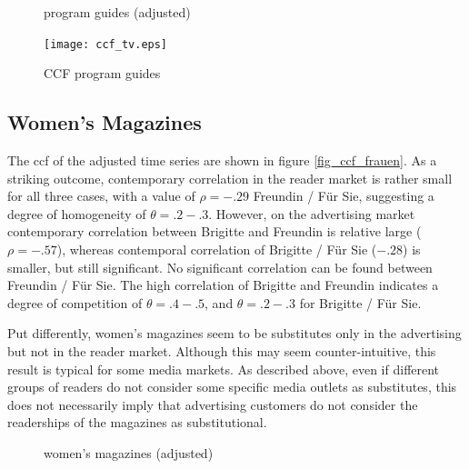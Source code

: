 \documentclass[12pt,a4paper,notitlepage]{article}
\begin{document}
\begin{figure}[H]
\caption{program guides (adjusted)}
\label{fig_arima_circ_tv}
\begin{minipage}
	\centering
	
\end{minipage}
\hfil
\begin{minipage}
	\centering
	
\end{minipage}
\end{figure}

\begin{figure}[H]
\caption{CCF program guides}
\label{fig_ccf_tv}
	\centering
	\texttt{[image: ccf\_tv.eps]}
\end{figure}




\subsection{Women's Magazines}

The ccf of the adjusted time series are shown in figure \ref{fig_ccf_frauen}. As a striking outcome, contemporary correlation in the reader market is rather small for all three cases, with a value of $\rho=-.29$ Freundin / Für Sie, suggesting a degree of homogeneity of $\theta=.2-.3$. However, on the advertising market contemporary correlation between Brigitte and Freundin is relative large ($\rho=-.57$), whereas contemporal correlation of Brigitte / Für Sie ($-.28$) is smaller, but still significant. No significant correlation can be found between Freundin / Für Sie. The high correlation of Brigitte and Freundin indicates a degree of competition of $\theta=.4-.5$, and $\theta=.2-.3$ for Brigitte / Für Sie. 

Put differently, women's magazines seem to be substitutes only in the advertising but not in the reader market. Although this may seem counter-intuitive, this result is typical for some media markets. As described above, even if different groups of readers do not consider some specific media outlets as substitutes, this does not necessarily imply that advertising customers do not consider the readerships of the magazines as substitutional. 


\begin{figure}[H]
\caption{women's magazines (adjusted)}
\begin{minipage}
	\centering
	
\end{minipage}
\hfil
\begin{minipage}
	\centering
	
\end{minipage}
\end{figure}
\end{document}
